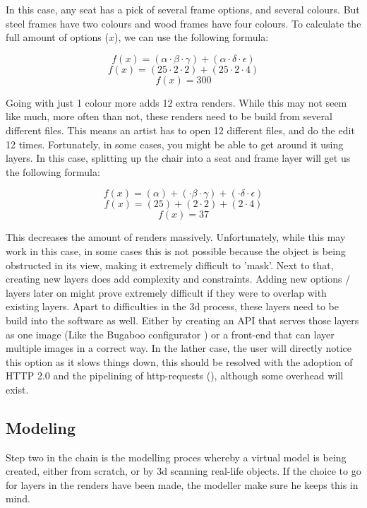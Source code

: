 In this case, any seat has a pick of several frame options, and several colours. But steel frames have two colours and wood frames have four colours. To calculate the full amount of options ($x$), we can use the following formula:
 
\[ f(x) = (\alpha \cdot \beta \cdot \gamma) + (\alpha \cdot \delta \cdot \epsilon)\]
\[ f(x) = (25 \cdot 2 \cdot 2) + (25 \cdot 2 \cdot 4)\]
\[ f(x) = 300\]

Going with just 1 colour more adds 12 extra renders. While this may not seem like much, more often than not, these renders need to be build from several different files. This means an artist has to open 12 different files, and do the edit 12 times.
Fortunately, in some cases, you might be able to get around it using layers. In this case, splitting up the chair into a seat and frame layer will get us the following formula:

\[ f(x) = (\alpha) + (\cdot \beta \cdot \gamma) + (\cdot \delta \cdot \epsilon)\]
\[ f(x) = (25) + (2 \cdot 2) + (2 \cdot 4)\]
\[ f(x) = 37\]

This decreases the amount of renders massively. Unfortunately, while this may work in this case, in some cases this is not possible because the object is being obstructed in its view, making it extremely difficult to 'mask'. Next to that, creating new layers does add complexity and constraints. Adding new options / layers later on might prove extremely difficult if they were to overlap with existing layers.
\newline
Apart to difficulties in the 3d process, these layers need to be build into the software as well. Either by creating an API that serves those layers as one image (Like the Bugaboo configurator \cite{Bugaboo} ) or a front-end that can layer multiple images in a correct way. In the lather case, the user will directly notice this option as it slows things down, this should be resolved with the adoption of HTTP 2.0 and the pipelining of http-requests (\cite{latency}), although some overhead will exist.

\subsection{Modeling}
Step two in the chain is the modelling proces whereby a virtual model is being created, either from scratch, or by 3d scanning real-life objects. If the choice to go for layers in the renders have been made, the modeller make sure he keeps this in mind.


